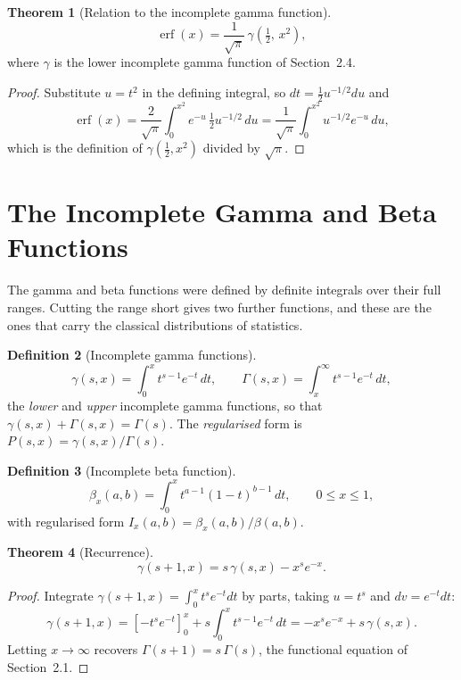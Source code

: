 \documentclass[12pt,a4paper]{report}
\theoremstyle{definition}
\newtheorem{thm}{Theorem}[section]
\newtheorem{defn}[thm]{Definition}
\theoremstyle{plain}
\begin{document}
\begin{thm}[Relation to the incomplete gamma function]
$$\operatorname{erf}(x) = \frac{1}{\sqrt{\pi}}\,\gamma\!\left(\tfrac12,\,x^{2}\right),$$
where $\gamma$ is the lower incomplete gamma function of Section~2.4.
\end{thm}

\begin{proof}
Substitute $u=t^{2}$ in the defining integral, so $dt = \tfrac12 u^{-1/2}du$ and
$$\operatorname{erf}(x)=\frac{2}{\sqrt\pi}\int^{x^{2}}_{0}e^{-u}\,\tfrac12 u^{-1/2}\,du
=\frac{1}{\sqrt\pi}\int^{x^{2}}_{0}u^{-1/2}e^{-u}\,du,$$
which is the definition of $\gamma\left(\tfrac12,x^{2}\right)$ divided by
$\sqrt{\pi}$.
\end{proof}

\section{The Incomplete Gamma and Beta Functions}

The gamma and beta functions were defined by definite integrals over their full
ranges. Cutting the range short gives two further functions, and these are the
ones that carry the classical distributions of statistics.

\begin{defn}[Incomplete gamma functions]
$$\gamma(s,x) = \int^{x}_{0}t^{s-1}e^{-t}\,dt,
\qquad
\Gamma(s,x) = \int^{\infty}_{x}t^{s-1}e^{-t}\,dt,$$
the \emph{lower} and \emph{upper} incomplete gamma functions, so that
$\gamma(s,x)+\Gamma(s,x)=\Gamma(s)$. The \emph{regularised} form is
$P(s,x) = \gamma(s,x)/\Gamma(s)$.
\end{defn}

\begin{defn}[Incomplete beta function]
$$\beta_x(a,b) = \int^{x}_{0}t^{a-1}(1-t)^{b-1}\,dt,
\qquad 0\leq x\leq 1,$$
with regularised form $I_x(a,b) = \beta_x(a,b)/\beta(a,b)$.
\end{defn}

\begin{thm}[Recurrence]
$$\gamma(s+1,x) = s\,\gamma(s,x) - x^{s}e^{-x}.$$
\end{thm}

\begin{proof}
Integrate $\gamma(s+1,x)=\int^{x}_{0}t^{s}e^{-t}dt$ by parts, taking $u=t^{s}$
and $dv=e^{-t}dt$:
$$\gamma(s+1,x) = \left[-t^{s}e^{-t}\right]^{x}_{0}
+ s\int^{x}_{0}t^{s-1}e^{-t}\,dt
= -x^{s}e^{-x} + s\,\gamma(s,x).$$
Letting $x\to\infty$ recovers $\Gamma(s+1)=s\,\Gamma(s)$, the functional
equation of Section~2.1.
\end{proof}
\end{document}
